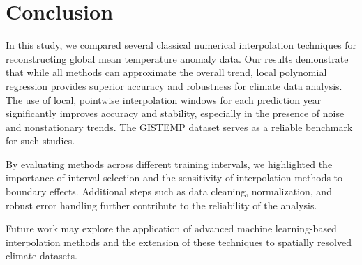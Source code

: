 \section{Conclusion}

In this study, we compared several classical numerical interpolation techniques for reconstructing global mean temperature anomaly data. Our results demonstrate that while all methods can approximate the overall trend, local polynomial regression provides superior accuracy and robustness for climate data analysis. The use of local, pointwise interpolation windows for each prediction year significantly improves accuracy and stability, especially in the presence of noise and nonstationary trends. The GISTEMP dataset \cite{gistemp} serves as a reliable benchmark for such studies.

By evaluating methods across different training intervals, we highlighted the importance of interval selection and the sensitivity of interpolation methods to boundary effects. Additional steps such as data cleaning, normalization, and robust error handling further contribute to the reliability of the analysis.

Future work may explore the application of advanced machine learning-based interpolation methods and the extension of these techniques to spatially resolved climate datasets.